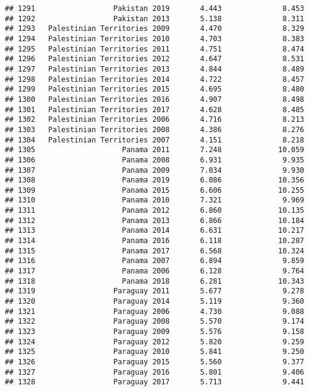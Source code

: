 \documentclass[
]{article}
\begin{document}
\begin{verbatim}
## 1291                  Pakistan 2019       4.443              8.453
## 1292                  Pakistan 2013       5.138              8.311
## 1293   Palestinian Territories 2009       4.470              8.329
## 1294   Palestinian Territories 2010       4.703              8.383
## 1295   Palestinian Territories 2011       4.751              8.474
## 1296   Palestinian Territories 2012       4.647              8.531
## 1297   Palestinian Territories 2013       4.844              8.489
## 1298   Palestinian Territories 2014       4.722              8.457
## 1299   Palestinian Territories 2015       4.695              8.480
## 1300   Palestinian Territories 2016       4.907              8.498
## 1301   Palestinian Territories 2017       4.628              8.485
## 1302   Palestinian Territories 2006       4.716              8.213
## 1303   Palestinian Territories 2008       4.386              8.276
## 1304   Palestinian Territories 2007       4.151              8.218
## 1305                    Panama 2011       7.248             10.059
## 1306                    Panama 2008       6.931              9.935
## 1307                    Panama 2009       7.034              9.930
## 1308                    Panama 2019       6.086             10.356
## 1309                    Panama 2015       6.606             10.255
## 1310                    Panama 2010       7.321              9.969
## 1311                    Panama 2012       6.860             10.135
## 1312                    Panama 2013       6.866             10.184
## 1313                    Panama 2014       6.631             10.217
## 1314                    Panama 2016       6.118             10.287
## 1315                    Panama 2017       6.568             10.324
## 1316                    Panama 2007       6.894              9.859
## 1317                    Panama 2006       6.128              9.764
## 1318                    Panama 2018       6.281             10.343
## 1319                  Paraguay 2011       5.677              9.278
## 1320                  Paraguay 2014       5.119              9.360
## 1321                  Paraguay 2006       4.730              9.088
## 1322                  Paraguay 2008       5.570              9.174
## 1323                  Paraguay 2009       5.576              9.158
## 1324                  Paraguay 2012       5.820              9.259
## 1325                  Paraguay 2010       5.841              9.250
## 1326                  Paraguay 2015       5.560              9.377
## 1327                  Paraguay 2016       5.801              9.406
## 1328                  Paraguay 2017       5.713              9.441

\end{verbatim}
\end{document}
